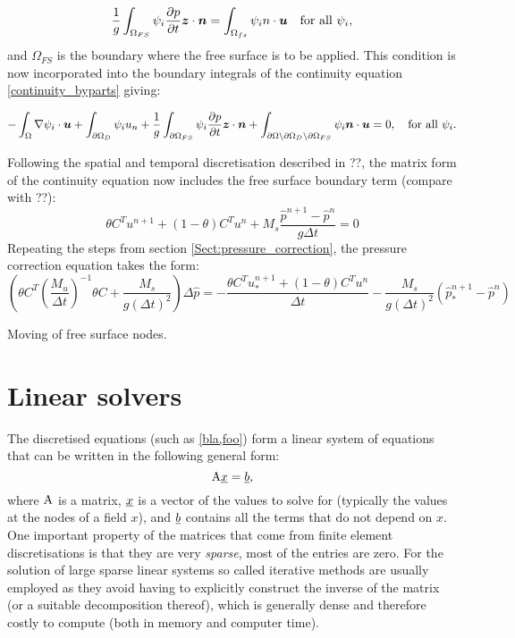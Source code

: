 \begin{equation}\label{weakfreesurf3}
\frac{1}{g} \int_{\Omega_{FS}} {\psi_i }\frac{\partial p}{\partial t}{\mbox{\boldmath$z$}} \cdot {\mbox{\boldmath$n$}}=\int_{\Omega_{fs}} \psi_i {n \cdot {\mbox{\boldmath$u$}}} \quad
  \text{for all } \psi_i,
\end{equation}
and $\Omega_{FS}$ is the boundary where the free surface is to be applied. This condition is now incorporated into the boundary integrals of the continuity equation \eqref{continuity_byparts} giving:

\begin{equation}\label{continuity_byparts_withfs}
  -\int_\Omega \nabla\psi_i \cdot {\mbox{\boldmath$u$}}
  + \int_{\partial\Omega_D} \psi_i u_n
  + \frac{1}{g} \int_{\partial\Omega_{FS}}  {\psi_i }\frac{\partial p}{\partial t}{\mbox{\boldmath$z$}} \cdot {\mbox{\boldmath$n$}}
  + \int_{\partial\Omega\setminus\partial\Omega_D\setminus\partial\Omega_{FS}} \psi_i{\mbox{\boldmath$n$}}\cdot {\mbox{\boldmath$u$}}
  = 0,\quad
  \text{for all } \psi_i.
\end{equation}

Following the spatial and temporal discretisation described in ??, the matrix form of the continuity equation now includes the free surface boundary term (compare with ??):
\begin{equation}
\theta C^T u^{n+1} + (1-\theta) C^T u^n + M_s \frac{\hat p^{n+1}-\hat p^n}{g \Delta t}=0
\end{equation}
Repeating the steps from section \ref{Sect:pressure_correction}, the pressure correction equation takes the form:
\begin{equation}
(\theta C^T(\frac{M_u}{\Delta t})^{-1} \theta C + \frac{M_s}{g(\Delta t)^2})\Delta \hat p = -\frac{\theta C^T u_*^{n+1} + (1-\theta)C^Tu^n}{\Delta t}-\frac{M_s}{g(\Delta t)^2}(\hat p_*^{n+1}-\hat p^n)
\end{equation}


Moving of free surface nodes.

\section{Linear solvers} \label{ND_Linear_solvers}
The discretised equations (such as \eqref{bla,foo}) form 
a linear system of equations that can be written 
in the following general form:
\begin{equation*}
  \mathrm{A}\underline{x}=\underline{b},
\end{equation*}
where $\mathrm{A}$ is a matrix, $\underline{x}$ is a vector of the values 
to solve for (typically the values at the nodes of a field $x$), 
and $\underline{b}$ contains all the terms that do not depend on 
$x$. One important property of the matrices that come from 
finite element discretisations is that they are very \emph{sparse}, 
\ie most of the entries are zero. For the solution of large
sparse linear systems so called iterative methods are usually employed
as they 
avoid having to explicitly construct the inverse of the matrix
(or a suitable decomposition thereof), 
which is generally dense and therefore costly to compute 
(both in memory and computer time).

